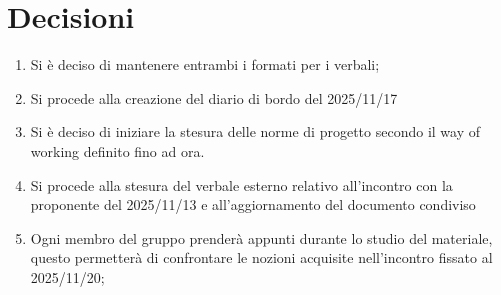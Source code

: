 \documentclass[a4paper,12pt]{article}
\begin{document}
\section{Decisioni}
\begin{enumerate}[noitemsep]
    \item Si è deciso di mantenere entrambi i formati per i verbali;
    \item Si procede alla creazione del diario di bordo del 2025/11/17
    \item Si è deciso di iniziare la stesura delle norme di progetto secondo il way of working definito fino ad ora.
    \item Si procede alla stesura del verbale esterno relativo all'incontro con la proponente del 2025/11/13 e all'aggiornamento del documento condiviso
    \item Ogni membro del gruppo prenderà appunti durante lo studio del materiale, questo permetterà di confrontare le nozioni acquisite nell'incontro fissato al 2025/11/20;

\end{enumerate}
\end{document}
